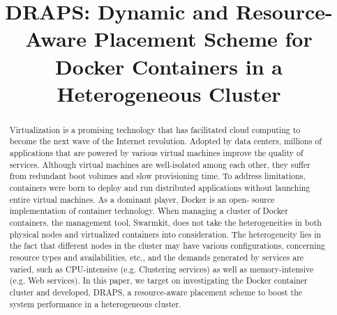 \documentclass[conference,10pt]{IEEEtran}
\begin{document}
\date{}


\title{\huge DRAPS: Dynamic and Resource-Aware Placement Scheme for Docker Containers in a Heterogeneous Cluster}

\author{
}


\maketitle

\begin{abstract}
Virtualization is a promising technology that has
facilitated cloud computing to become the next wave of the Internet revolution.
Adopted by data centers, millions of applications
that are powered by various virtual machines improve the quality
of services. Although virtual machines are well-isolated among
each other, they suffer from redundant boot volumes and slow
provisioning time. To address limitations, containers were born
to deploy and run distributed applications without launching
entire virtual machines. As a dominant player, Docker is an open-
source implementation of container technology. When managing
a cluster of Docker containers, the management tool, Swarmkit,
does not take the heterogeneities in both physical nodes and
virtualized containers into consideration. The heterogeneity lies
in the fact that different nodes in the cluster may have various
configurations, concerning resource types and availabilities, etc., and the demands
generated by services are varied, such as CPU-intensive (e.g.
Clustering services) as well as memory-intensive (e.g. Web services). In this
paper, we target on investigating the Docker container cluster
and developed, DRAPS, a resource-aware placement scheme to
boost the system performance in a heterogeneous cluster.
\end{abstract}











\end{document}
